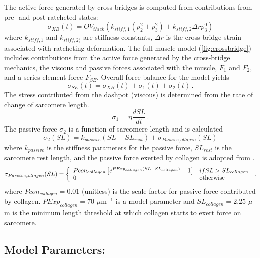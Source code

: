 \documentclass[fleqn,10pt]{physiome}
\begin{document}
The active force generated by cross-bridges is computed from contributions from pre- and post-ratcheted states:
\begin{equation}\label{eq:activeforce}
  \sigma_{XB} (t) = OV_{thick} ( k_{stiff,1}  \left(p_2^2 + p_3^2 \right) + k_{stiff,2} \Delta r p_3^0 )
\end{equation}
where $k_{stiff,1}$ and $k_{stiff,2)}$ are stiffness constants, $\Delta r$ is the cross bridge strain associated with ratcheting deformation.
The full muscle model (\autoref{fig:crossbridge}) includes contributions from the active force generated by the cross-bridge mechanics, the viscous and passive forces associated with the muscle, $F_1$ and $F_2$, and a series element force $F_{SE}$. Overall force balance for the model yields
\begin{equation}\label{eq:totalforce}
  \sigma_{SE} (t) = \sigma_{XB} (t) + \sigma_1 (t) + \sigma_2 (t) \, .
\end{equation}
The stress contributed from the dashpot (viscous) is determined from the rate of change of sarcomere length.
\begin{equation}\label{eq:viscosity}
  \sigma_1 = \eta \frac{dSL}{dt} \, .
\end{equation}
The passive force $\sigma_2$ is a function of sarcomere length and is calculated 
\begin{equation}
  \sigma_2 (SL)= k_{passive}  \left(SL - SL_{rest} \right) + \sigma_{Passive_collagen} (SL)
\end{equation}
where $k_{passive}$ is the stiffness parameters for the passive force, $SL_{rest}$ is the sarcomere rest length, and the passive force exerted by collagen is adopted from \cite{Rice2008}.
\begin{eqnarray}
  \sigma_{Passive_collagen} (SL) = \left\{ \begin{array}{ll} 
    Pcon_{collagen} \left[ e^{PExp_{collagen}(SL - SL_{collagen})} -1 \right] &  if SL > SL_{collagen} \\ 
    0 & {\rm otherwise} \end{array} \right. \, .
\end{eqnarray}
where $Pcon_{collagen} = 0.01$ (unitless) is the scale factor for passive force contributed by collagen. 
$PExp_{collagen} = 70$ $\mu$m$^{-1}$ is a model parameter and $SL_{collagen} = 2.25$ $\mu$m is the minimum length threshold at which collagen starts to exert force on sarcomere.
 
\subsection{Model Parameters:}
\end{document}
